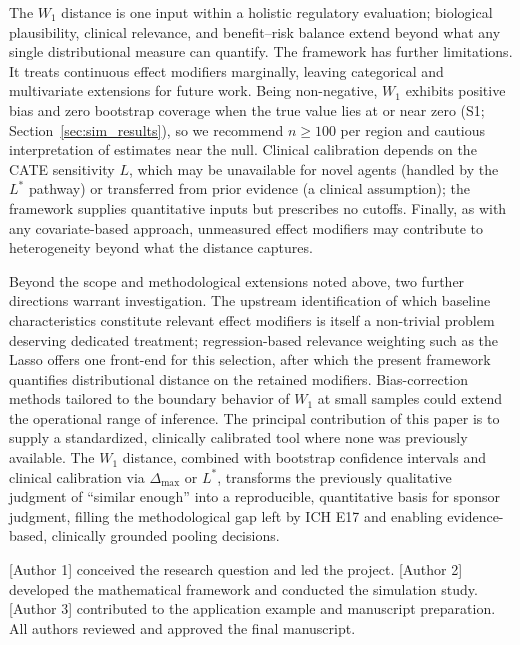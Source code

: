\documentclass[AMA,Times1COL]{WileyNJDv5}
\begin{document}
The $W_1$ distance is one input within a holistic regulatory evaluation; biological plausibility, clinical relevance, and benefit--risk balance extend beyond what any single distributional measure can quantify.\cite{iche17,matsushima2024} The framework has further limitations. It treats continuous effect modifiers marginally, leaving categorical and multivariate extensions for future work. Being non-negative, $W_1$ exhibits positive bias and zero bootstrap coverage when the true value lies at or near zero (S1; Section~\ref{sec:sim_results}),\cite{andrews2000} so we recommend $n \geq 100$ per region and cautious interpretation of estimates near the null. Clinical calibration depends on the CATE sensitivity $L$, which may be unavailable for novel agents (handled by the $L^*$ pathway) or transferred from prior evidence (a clinical assumption); the framework supplies quantitative inputs but prescribes no cutoffs. Finally, as with any covariate-based approach, unmeasured effect modifiers may contribute to heterogeneity beyond what the distance captures.

Beyond the scope and methodological extensions noted above, two further directions warrant investigation. The upstream identification of which baseline characteristics constitute relevant effect modifiers is itself a non-trivial problem deserving dedicated treatment; regression-based relevance weighting such as the Lasso offers one front-end for this selection,\cite{komiyama2024} after which the present framework quantifies distributional distance on the retained modifiers. Bias-correction methods tailored to the boundary behavior of $W_1$ at small samples could extend the operational range of inference. The principal contribution of this paper is to supply a standardized, clinically calibrated tool where none was previously available. The $W_1$ distance, combined with bootstrap confidence intervals and clinical calibration via $\Delta_{\max}$ or $L^*$, transforms the previously qualitative judgment of ``similar enough'' into a reproducible, quantitative basis for sponsor judgment, filling the methodological gap left by ICH E17 and enabling evidence-based, clinically grounded pooling decisions.



[Author 1] conceived the research question and led the project. [Author 2] developed the mathematical framework and conducted the simulation study. [Author 3] contributed to the application example and manuscript preparation. All authors reviewed and approved the final manuscript.
\end{document}
